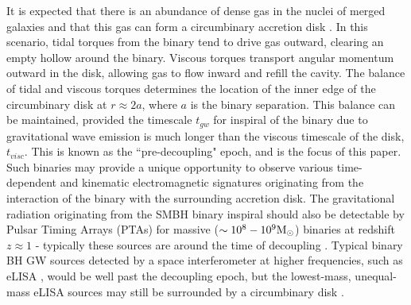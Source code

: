 \documentclass[apj]{emulateapj}
\begin{document}
It is expected that there is an abundance of dense gas in the nuclei of merged galaxies \citep{barnes92,springel05} and that this gas can form a circumbinary accretion disk \citep{artymowicz96,armitage02,milos05}. In this scenario, tidal torques from the binary tend to drive gas outward, clearing an empty hollow around the binary. Viscous torques transport angular momentum outward in the disk, allowing gas to flow inward and refill the cavity. The balance of tidal and viscous torques determines the location of the inner edge of the circumbinary disk at $r\approx 2 a$, where $a$ is the binary separation. This balance can be maintained, provided the timescale $t_{gw}$ for inspiral of the binary due to gravitational wave emission is much longer than the viscous timescale of the disk, $t_{visc}$. This is known as the ``pre-decoupling" epoch, and is the focus of this
paper. Such binaries may provide a unique opportunity to observe
various time-dependent and kinematic electromagnetic signatures
originating from the interaction of the binary with the surrounding
accretion disk.  The gravitational radiation originating from the SMBH
binary inspiral should also be detectable by Pulsar Timing Arrays
(PTAs) for massive ($\sim 10^8-10^9 {\rm M_\odot}$) binaries at
redshift $z\approx 1$ - typically these sources are around the time
of decoupling \citep{tanaka12,lommen12,sesana12}. Typical binary BH GW
sources detected by a space interferometer at higher frequencies, such
as eLISA \citep{amaroseoane13}, would be well past the decoupling epoch, but the
lowest-mass, unequal-mass eLISA sources may still be surrounded by a
circumbinary disk \citep{kocsis11, kocsis12b}.
\end{document}
